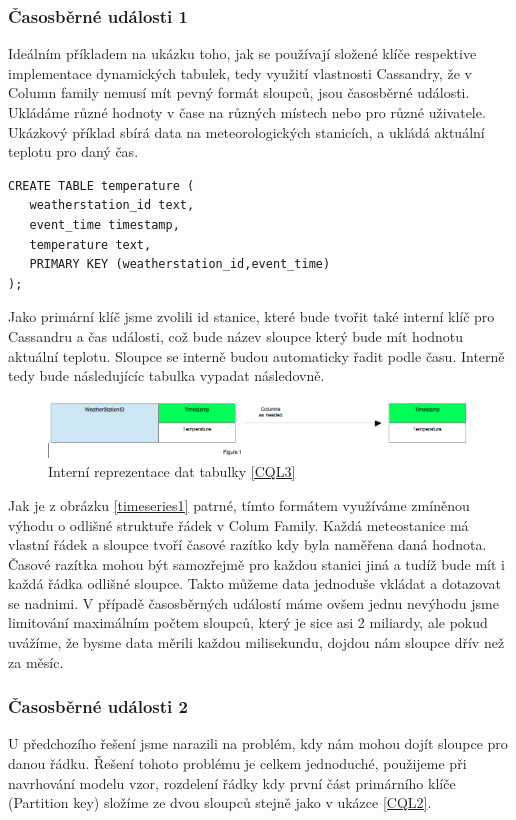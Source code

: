 \documentclass[thesis=M,czech]{FITthesis}[2012/06/26]
\begin{document}
\subsubsection*{Časosběrné události 1}
Ideálním příkladem na ukázku toho, jak se používají složené klíče respektive implementace dynamických tabulek, tedy využití vlastnosti Cassandry, že v Column family nemusí mít pevný formát sloupců, jsou časosběrné události. Ukládáme různé hodnoty v čase na různých místech nebo pro různé uživatele. Ukázkový příklad sbírá data na meteorologických stanicích, a ukládá aktuální teplotu pro daný čas.

\begin{lstlisting}[caption={Dynamická tabulka 1},label=CQL3]
CREATE TABLE temperature (
   weatherstation_id text,
   event_time timestamp,
   temperature text,
   PRIMARY KEY (weatherstation_id,event_time)
);
\end{lstlisting}

Jako primární klíč jsme zvolili id stanice, které bude tvořit také interní klíč pro Cassandru a čas události, což bude název sloupce který bude mít hodnotu aktuální teplotu. Sloupce se interně budou automaticky řadit podle času. Interně tedy bude následujícíc tabulka vypadat následovně. 

\begin{figure}[h]
\centering
\includegraphics[scale=0.4]{images/timeseries1}
\caption{Interní reprezentace dat tabulky \ref{CQL3}}
\label{fig:timeseries1}
\end{figure}

Jak je z obrázku \ref{timeseries1} patrné, tímto formátem využíváme zmíněnou výhodu o odlišné struktuře řádek v Colum Family. Každá meteostanice má vlastní řádek a sloupce tvoří časové razítko kdy byla naměřena daná hodnota. Časové razítka mohou být samozřejmě pro každou stanici jiná a tudíž bude mít i každá řádka odlišné sloupce. Takto můžeme data jednoduše vkládat a dotazovat se nadnimi. V případě časosběrných událostí máme ovšem jednu nevýhodu jsme limitování maximálním počtem sloupců, který je sice asi 2 miliardy, ale pokud uvážíme, že bysme data měrili každou milisekundu, dojdou nám sloupce dřív než za měsíc.  

\subsubsection*{Časosběrné události 2}
U předchozího řešení jsme narazili na problém, kdy nám mohou dojít sloupce pro danou řádku. Řešení tohoto problému je celkem jednoduché, použijeme při navrhování modelu vzor, rozdelení řádky kdy první část primárního klíče (Partition key) složíme ze dvou sloupců stejně jako v ukázce \ref{CQL2}.
\end{document}
